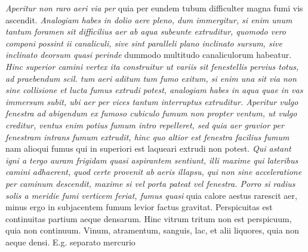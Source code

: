 \textit{Aperitur non raro aeri via per } quia per eundem tubum difficulter magna fumi vis ascendit. \textit{Analogiam habes in dolio aere pleno, dum immergitur, si enim unum tantum foramen sit difficilius aer ab aqua subeunte extruditur, quomodo vero componi possint ii canaliculi\protect{}, sive sint paralleli plano inclinato sursum, sive inclinato deorsum quasi perinde } dummodo multitudo canaliculorum habeatur. \textit{Hinc superior camini vertex\protect{} ita construitur ut variis sit fenestellis pervius totus, ad praebendum scil. tum aeri aditum tum fumo exitum, si enim una sit via non sine collisione et lucta fumus extrudi potest, analogiam habes in aqua quae in vas immersum subit, ubi aer per vices tantum interruptus extruditur. Aperitur vulgo fenestra ad abigendum ex fumoso cubiculo fumum non propter ventum, ut vulgo creditur, ventus enim potius fumum intro repelleret, sed quia aer gravior per fenestram intrans fumum extrudit, hinc quo altior est fenestra facilius fumum } nam alioqui fumus qui in superiori est laqueari extrudi non potest. \textit{Qui astant igni a tergo auram frigidam quasi aspirantem sentiunt, illi maxime qui lateribus camini adhaerent, quod certe provenit ab aeris illapsu, qui non sine acceleratione per caminum descendit, maxime si vel porta pateat vel fenestra. Porro si radius solis\protect{} a meridie fumi verticem feriat, fumus quasi } quia calore  aestus rarescit aer, minus ergo in subjacentem fumum levior factus gravitat.
\pend 
\pstart {} Perspicuitas\protect{} est continuitas partium aeque densarum. Hinc vitrum tritum non est perspicuum, quia non continuum. Vinum\protect{}, atramentum\protect{}, sanguis\protect{}, lac, et alii liquores, quia non aeque densi. \mbox{E.g.} separato mercurio\protect{}
